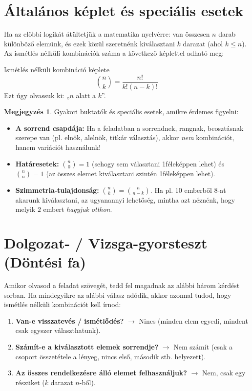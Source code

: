 \documentclass[a4paper,12pt]{article}
\newcommand{\textbfr}[1]{\textbf{\textcolor{bvred}{#1}}} %
\theoremstyle{definition} %
\newtheorem*{remark}{\mytriangle{bvred} Megjegyzés}
\begin{document}
\section{Általános képlet és speciális esetek}
Ha az előbbi logikát átültetjük a matematika nyelvérre: van összesen $n$ darab különböző elemünk, és ezek közül szeretnénk kiválasztani $k$ darazat (ahol $k \le n$). Az ismétlés nélküli kombinációk száma a következő képlettel adható meg:

\begin{teteldoboz}{Ismétlés nélküli kombináció képlete}
$$\binom{n}{k} = \frac{n!}{k!(n-k)!}$$
Ezt úgy olvassuk ki: „$n$ alatt a $k$”.
\end{teteldoboz}

\begin{remark}
Gyakori buktatók és speciális esetek, amikre érdemes figyelni:
\begin{itemize}
    \item \textbf{A sorrend csapdája:} Ha a feladatban a sorrendnek, rangnak, beosztásnak szerepe van (pl. elnök, alelnök, titkár választás), akkor \textit{nem} kombinációt, hanem variációt használunk!
    \item \textbf{Határesetek:} $\binom{n}{0} = 1$ (sehogy sem választani 1féleképpen lehet) és $\binom{n}{n} = 1$ (az összes elemet kiválasztani szintén 1féleképpen lehet).
    \item \textbf{Szimmetria-tulajdonság:} $\binom{n}{k} = \binom{n}{n-k}$. Ha pl. $10$ emberből $8$-at akarunk kiválasztani, az ugyanannyi lehetőség, mintha azt néznénk, hogy melyik $2$ embert \textit{hagyjuk otthon}.
\end{itemize}
\end{remark}

\section{Dolgozat- / Vizsga-gyorsteszt (Döntési fa)}
Amikor olvasod a feladat szövegét, tedd fel magadnak az alábbi három kérdést sorban. Ha mindegyikre az alábbi válasz adódik, akkor azonnal tudod, hogy ismétlés nélküli kombinációt kell írnod:

\begin{enumerate}[label=\textbfr{\arabic*}.]
    \item \textbf{Van-e visszatevés / ismétlődés?} $\rightarrow$ Nincs (minden elem egyedi, mindent csak egyszer választhatunk).
    \item \textbf{Számít-e a kiválasztott elemek sorrendje?} $\rightarrow$ Nem számít (csak a csoport összetétele a lényeg, nincs első, második stb. helyezett).
    \item \textbf{Az összes rendelkezésre álló elemet felhasználjuk?} $\rightarrow$ Nem, csak egy részüket ($k$ darazat $n$-ből).
\end{enumerate}
\end{document}
